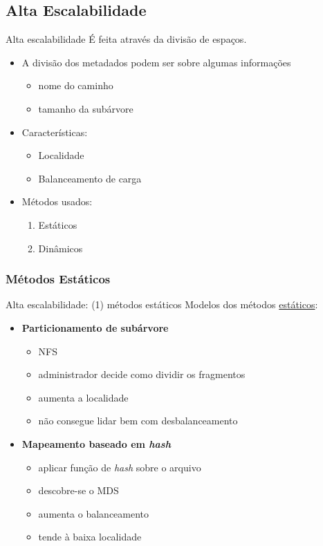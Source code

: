 \documentclass[xcolor=dvipsnames,table]{beamer}
\begin{document}
\subsection{Alta Escalabilidade}
\begin{frame}{Alta escalabilidade}
	É feita através da divisão de espaços.

	\begin{itemize}
		\item A divisão dos metadados podem ser sobre algumas informações
		\begin{itemize}
			\item nome do caminho
			\item tamanho da subárvore
		\end{itemize}
		\item Características:
		\begin{itemize}
			\item Localidade
			\item Balanceamento de carga
		\end{itemize}
		\item Métodos usados:
		\begin{enumerate}
			\item Estáticos
			\item Dinâmicos
		\end{enumerate}
	\end{itemize}
\end{frame}

\subsubsection{Métodos Estáticos}
\begin{frame}{Alta escalabilidade: (1) métodos estáticos}
	Modelos dos métodos \underline{estáticos}:
	\begin{itemize}
		\item \textbf{Particionamento de subárvore}
		\begin{itemize}
			\item NFS
			\item administrador decide como dividir os fragmentos
			\item aumenta a localidade
			\item não consegue lidar bem com desbalanceamento
		\end{itemize}
		\item \textbf{Mapeamento baseado em \textit{hash}}
		\begin{itemize}
			\item aplicar função de \textit{hash} sobre o arquivo
			\item descobre-se o MDS
			\item aumenta o balanceamento
			\item tende à baixa localidade
		\end{itemize}
	\end{itemize}
\end{frame}
\end{document}
